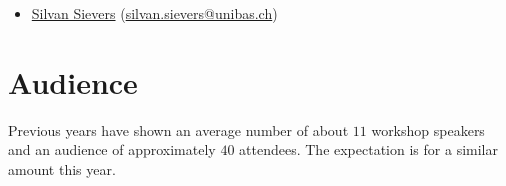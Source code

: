 \documentclass[10pt]{article}
\begin{document}
\begin{itemize}





\item \href{http://ai.cs.unibas.ch/people/}{Silvan Sievers}
  (\href{mailto:silvan.sievers@unibas.ch}{silvan.sievers@unibas.ch})\\



\end{itemize}

\section*{Audience}
Previous years have shown an average number of about $11$ workshop
speakers and an audience of approximately $40$ attendees. The
expectation is for a similar amount this year.
\end{document}
